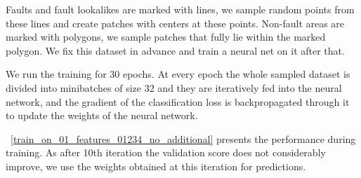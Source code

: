 \documentclass[11pt,a4paper]{article}
\begin{document}
Faults and fault lookalikes are marked with lines, we sample random points from these lines and create patches with
centers at these points. Non-fault areas are marked with polygons, we sample patches that fully lie within the marked
polygon. We fix this dataset in advance and train a neural net on it after that.

We run the training for 30 epochs. At every epoch the whole sampled dataset is divided into minibatches of size 32 and
they are iteratively fed into the neural network, and the gradient of the classification loss is backpropagated through
it to update the weights of the neural network.

\figurename~\ref{train_on_01_features_01234_no_additional} presents the performance during training. As after 10th
iteration the validation score does not considerably improve, we use the weights obtained at this iteration for predictions.
\end{document}
